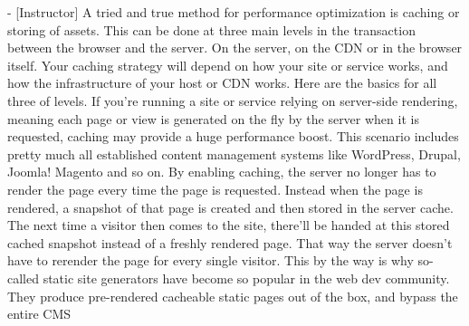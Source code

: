 - [Instructor] A tried and true method for performance optimization is caching or 
storing of assets. This can be done at three main levels in the transaction between 
the browser and the server. On the server, on the CDN or in the browser itself. Your
caching strategy will depend on how your site or service works, and how the 
infrastructure of your host or CDN works. Here are the basics for all three of 
levels. If you're running a site or service relying on server-side rendering, 
meaning each page or view is generated on the fly by the server when it is 
requested, caching may provide a huge performance boost. This scenario includes 
pretty much all established content management systems like WordPress, Drupal, 
Joomla! Magento and so on. By enabling caching, the server no longer has to render
the page every time the page is requested. Instead when the page is rendered, a 
snapshot of that page is created and then stored in the server cache. The next 
time a visitor then comes to the site, there'll be handed at this stored cached 
snapshot instead of a freshly rendered page. That way the server doesn't have to
rerender the page for every single visitor. This by the way is why so-called static
site generators have become so popular in the web dev community. They produce 
pre-rendered cacheable static pages out of the box, and bypass the entire CMS 

